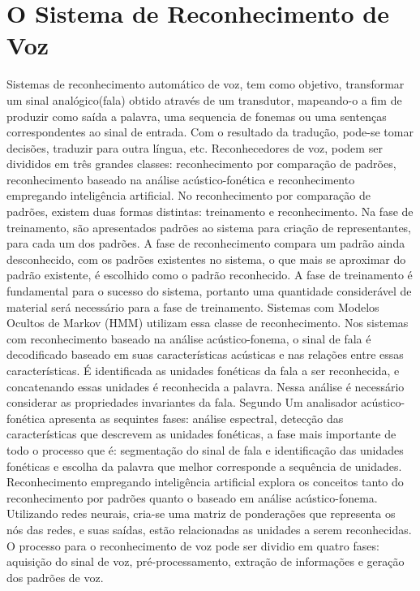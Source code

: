 \section{O Sistema de Reconhecimento de Voz}\label{sec:red_khn}
Sistemas de reconhecimento automático de voz, tem como objetivo, transformar um sinal analógico(fala) obtido através de um transdutor, mapeando-o a fim de produzir como saída a palavra, uma sequencia de fonemas ou uma sentenças correspondentes ao sinal de entrada. Com o resultado da tradução, pode-se tomar decisões, traduzir para outra língua, etc.
Reconhecedores de voz, podem ser divididos em três grandes classes: reconhecimento por comparação de padrões, reconhecimento baseado na análise acústico-fonética e reconhecimento empregando inteligência artificial.\cite{FundamentRabiner} No reconhecimento por comparação de padrões, existem duas formas distintas: treinamento e reconhecimento. Na fase de treinamento, são apresentados padrões ao sistema para criação de representantes, para cada um dos padrões. A fase de reconhecimento compara um padrão ainda desconhecido, com os padrões existentes no sistema, o que mais se aproximar do padrão existente, é escolhido como o padrão reconhecido. A fase de treinamento é fundamental para o sucesso do sistema, portanto uma quantidade considerável de material será necessário para a fase de treinamento. Sistemas com Modelos Ocultos de Markov (HMM) utilizam essa classe de reconhecimento.\cite{AvaliaTecJose} Nos sistemas com reconhecimento baseado na análise acústico-fonema, o sinal de fala é decodificado baseado em suas características acústicas e nas relações entre essas características. \cite{DigSpeechNejat} É identificada as unidades fonéticas da fala a ser reconhecida, e concatenando essas unidades é reconhecida a palavra. Nessa análise é necessário considerar as propriedades invariantes da fala. Segundo \cite{AvaliaTecJose} Um analisador acústico-fonética apresenta as sequintes fases: análise espectral, detecção das características que descrevem as unidades fonéticas, a fase mais importante de todo o processo que é: segmentação do sinal de fala e identificação das unidades fonéticas e escolha da palavra que melhor corresponde a sequência de unidades. Reconhecimento empregando inteligência artificial explora os conceitos tanto do reconhecimento por padrões quanto o baseado em análise acústico-fonema. \cite{FundamentRabiner} Utilizando redes neurais, cria-se uma matriz de ponderações que representa os nós das redes, e suas saídas, estão relacionadas as unidades a serem reconhecidas. \cite{AvaliaTecJose}
O processo para o reconhecimento de voz pode ser dividio em quatro fases: aquisição do sinal de voz, pré-processamento, extração de informações e geração dos padrões de voz. \cite{RavIsoladas} 




